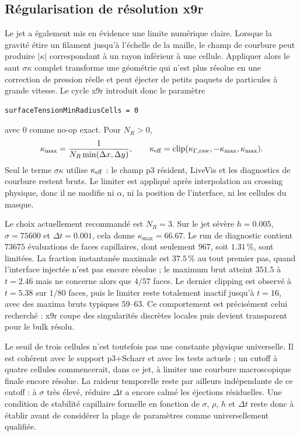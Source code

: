 \documentclass[11pt,a4paper]{article}
\begin{document}
\subsection{Régularisation de résolution x9r}

Le jet a également mis en évidence une limite numérique claire. Lorsque la gravité étire un filament jusqu'à l'échelle de la maille, le champ de courbure peut produire $|\kappa|$ correspondant à un rayon inférieur à une cellule. Appliquer alors le saut $\sigma\kappa$ complet transforme une géométrie qui n'est plus résolue en une correction de pression réelle et peut éjecter de petits paquets de particules à grande vitesse. Le cycle x9r introduit donc le paramètre
\begin{verbatim}
surfaceTensionMinRadiusCells = 0
\end{verbatim}
avec $0$ comme no-op exact. Pour $N_R>0$,
\begin{equation}
  \kappa_{\max}=\frac{1}{N_R\min(\Delta x,\Delta y)},
  \qquad
  \kappa_{\rm eff}
  =\operatorname{clip}(\kappa_{\Gamma,\rm raw},-\kappa_{\max},\kappa_{\max}).
  \label{eq:x9r_kappa_clip}
\end{equation}
Seul le terme $\sigma\kappa$ utilise $\kappa_{\rm eff}$ : le champ p3 résident, LiveVis et les diagnostics de courbure restent bruts. Le limiter est appliqué après interpolation au crossing physique, donc il ne modifie ni $\alpha$, ni la position de l'interface, ni les cellules du masque.

Le choix actuellement recommandé est $N_R=3$. Sur le jet sévère $h=0.005$, $\sigma=75600$ et $\Delta t=0.001$, cela donne $\kappa_{\max}=66.67$. Le run de diagnostic contient $73675$ évaluations de faces capillaires, dont seulement $967$, soit $1.31\,\%$, sont limitées. La fraction instantanée maximale est $37.5\,\%$ au tout premier pas, quand l'interface injectée n'est pas encore résolue ; le maximum brut atteint $351.5$ à $t=2.46$ mais ne concerne alors que $4/57$ faces. Le dernier clipping est observé à $t=5.38$ sur $1/80$ faces, puis le limiter reste totalement inactif jusqu'à $t=16$, avec des maxima bruts typiques $59$--$63$. Ce comportement est précisément celui recherché : x9r coupe des singularités discrètes locales puis devient transparent pour le bulk résolu.

Le seuil de trois cellules n'est toutefois pas une constante physique universelle. Il est cohérent avec le support p3+Scharr et avec les tests actuels ; un cutoff à quatre cellules commencerait, dans ce jet, à limiter une courbure macroscopique finale encore résolue. La raideur temporelle reste par ailleurs indépendante de ce cutoff : à $\sigma$ très élevé, réduire $\Delta t$ a encore calmé les éjections résiduelles. Une condition de stabilité capillaire formelle en fonction de $\sigma$, $\rho$, $h$ et $\Delta t$ reste donc à établir avant de considérer la plage de paramètres comme universellement qualifiée.
\end{document}
